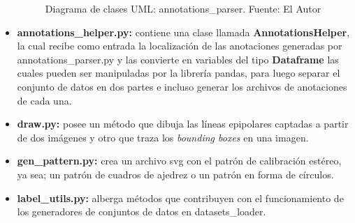 \begin{itemize}
\begin{figure}[H]
        \caption[Diagrama de clases UML: annotations\_parser.]{Diagrama de clases UML: annotations\_parser. {\footnotesize Fuente: El Autor}}
        \label{annotations_parser_uml}
    \end{figure}
    \item \textbf{annotations\_helper.py:} contiene una clase llamada \textbf{AnnotationsHelper}, la cual recibe como entrada la localización de las anotaciones generadas por annotations\_parser.py y las convierte en variables del tipo \textbf{Dataframe} las cuales pueden ser manipuladas por la librería pandas, para luego separar el conjunto de datos en dos partes e incluso generar los archivos de anotaciones de cada una.
    \item \textbf{draw.py:} posee un método que dibuja las líneas epipolares captadas a partir de dos imágenes y otro que traza los \textit{bounding boxes} en una imagen.
    \item \textbf{gen\_pattern.py:} crea un archivo svg con el patrón de calibración estéreo, ya sea; un patrón de cuadros de ajedrez o un patrón en forma de círculos.
    \item \textbf{label\_utils.py:} alberga métodos que contribuyen con el funcionamiento de los generadores de conjuntos de datos en datasets\_loader.
\end{itemize}
